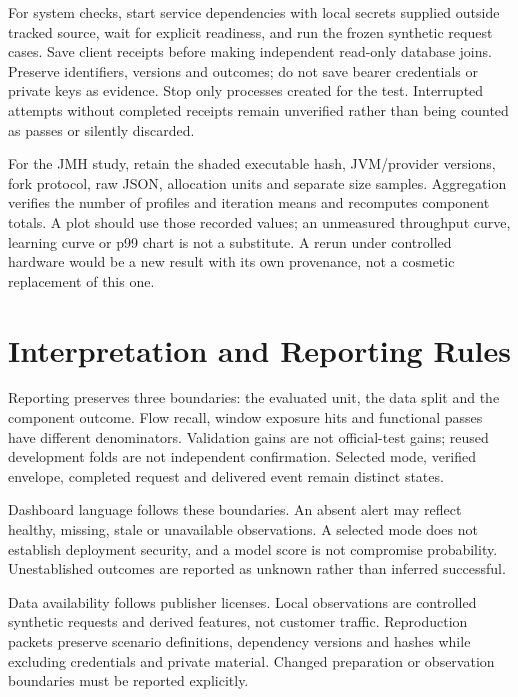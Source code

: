 \documentclass[conference,a4paper]{IEEEtran}
\begin{document}
For system checks, start service dependencies with local secrets supplied outside tracked source, wait for explicit readiness, and run the frozen synthetic request cases. Save client receipts before making independent read-only database joins. Preserve identifiers, versions and outcomes; do not save bearer credentials or private keys as evidence. Stop only processes created for the test. Interrupted attempts without completed receipts remain unverified rather than being counted as passes or silently discarded.

For the JMH study, retain the shaded executable hash, JVM/provider versions, fork protocol, raw JSON, allocation units and separate size samples. Aggregation verifies the number of profiles and iteration means and recomputes component totals. A plot should use those recorded values; an unmeasured throughput curve, learning curve or p99 chart is not a substitute. A rerun under controlled hardware would be a new result with its own provenance, not a cosmetic replacement of this one.

\section{Interpretation and Reporting Rules}
Reporting preserves three boundaries: the evaluated unit, the data split and the component outcome. Flow recall, window exposure hits and functional passes have different denominators. Validation gains are not official-test gains; reused development folds are not independent confirmation. Selected mode, verified envelope, completed request and delivered event remain distinct states.

Dashboard language follows these boundaries. An absent alert may reflect healthy, missing, stale or unavailable observations. A selected mode does not establish deployment security, and a model score is not compromise probability. Unestablished outcomes are reported as unknown rather than inferred successful.

Data availability follows publisher licenses. Local observations are controlled synthetic requests and derived features, not customer traffic. Reproduction packets preserve scenario definitions, dependency versions and hashes while excluding credentials and private material. Changed preparation or observation boundaries must be reported explicitly.
\end{document}
